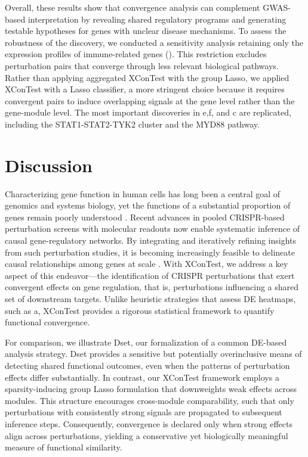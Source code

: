 \documentclass[11pt]{article}
\begin{document}
Overall, these results show that convergence analysis can complement GWAS-based interpretation by revealing shared regulatory programs and generating testable hypotheses for genes with unclear disease mechanisms. To assess the robustness of the discovery, we conducted a sensitivity analysis retaining only the expression profiles of immune-related genes (). This restriction excludes perturbation pairs that converge through less relevant biological pathways. Rather than applying aggregated XConTest with the group Lasso, we applied XConTest with a Lasso classifier, a more stringent choice because it requires convergent pairs to induce overlapping signals at the gene level rather than the gene-module level. The most important discoveries in e,f, and c are replicated, including the STAT1-STAT2-TYK2 cluster and the MYD88 pathway.

\section*{Discussion}

Characterizing gene function in human cells has long been a central goal of genomics and systems biology, yet the functions of a substantial proportion of genes remain poorly understood \citep{stoeger2018large}. Recent advances in pooled CRISPR-based perturbation screens with molecular readouts now enable systematic inference of causal gene-regulatory networks. By integrating and iteratively refining insights from such perturbation studies, it is becoming increasingly feasible to delineate causal relationships among genes at scale \citep{rood2024toward}. With XConTest, we address a key aspect of this endeavor---the identification of CRISPR perturbations that exert convergent effects on gene regulation, that is, perturbations influencing a shared set of downstream targets. Unlike heuristic strategies that assess DE heatmaps, such as a, XConTest provides a rigorous statistical framework to quantify functional convergence.

For comparison, we illustrate Dset, our formalization of a common DE-based analysis strategy. Dset provides a sensitive but potentially overinclusive means of detecting shared functional outcomes, even when the patterns of perturbation effects differ substantially. In contrast, our XConTest framework employs a sparsity-inducing group Lasso formulation that downweights weak effects across modules. This structure encourages cross-module comparability, such that only perturbations with consistently strong signals are propagated to subsequent inference steps. Consequently, convergence is declared only when strong effects align across perturbations, yielding a conservative yet biologically meaningful measure of functional similarity.
\end{document}
